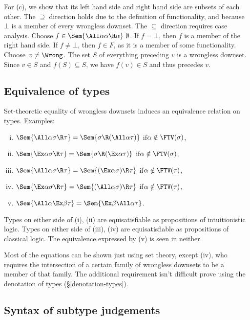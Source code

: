 \documentclass{amsart}
\theoremstyle{definition}
\begin{document}
For (c), we show that its left hand side and right hand side are
subsets of each other. The $\supseteq$ direction holds due to the
definition of functionality, and because $\bot$ is a member of
every wrongless downset. The $\subseteq$ direction requires case
analysis. Choose $f\in\Sem{\All\alpha\alpha\R\alpha}~\emptyset$.
If $f=\bot$, then $f$ is a member of the right hand side. If
$f\neq\bot$, then $f\in F$, as it is a member of some
functionality. Choose~$v\neq\Wrong$. The set $S$ of everything
preceding $v$ is a wrongless downset. Since $v\in S$ and
$f(S)\subseteq S$, we have $f(v)\in S$ and thus precedes $v$.

\subsection{Equivalence of types}
Set-theoretic equality of wrongless downsets induces an
equivalence relation on types. Examples:
\begin{enumerate}[(i)]
\item
$\Sem{\All\alpha\sigma\R\tau}=\Sem{\sigma\R(\All\alpha\tau)}$
\quad if\quad $\alpha\notin\FTV(\sigma)$,
\item
$\Sem{\Ex\alpha\sigma\R\tau}=\Sem{\sigma\R(\Ex\alpha\tau)}$
\quad if\quad $\alpha\notin\FTV(\sigma)$,
\item
$\Sem{\All\alpha\sigma\R\tau}=\Sem{(\Ex\alpha\sigma)\R\tau}$
\quad if\quad $\alpha\notin\FTV(\tau)$,
\item
$\Sem{\Ex\alpha\sigma\R\tau}=\Sem{(\All\alpha\sigma)\R\tau}$
\quad if\quad $\alpha\notin\FTV(\tau)$,
\item
$\Sem{\All\alpha\Ex\beta\tau}=\Sem{\Ex\beta\All\alpha\tau}$.
\end{enumerate}
Types on either side of (i), (ii) are equisatisfiable as
propositions of intuitionistic logic. Types on either side of
(iii), (iv) are equisatisfiable as propositions of classical
logic. The equivalence expressed by (v) is seen in neither.

Most of the equations can be shown just using set theory, except
(iv), who requires the intersection of a certain family of
wrongless downsets to be a member of that family. The additional
requirement isn't difficult prove using the denotation of types
(\S\ref{denotation-types}).

\subsection{Syntax of subtype judgements}
\end{document}
